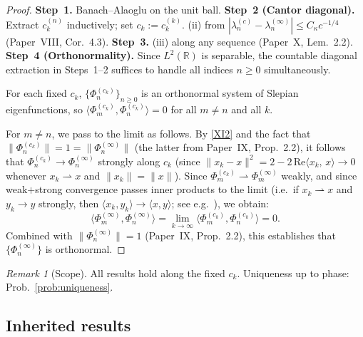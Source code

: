 \documentclass[12pt,a4paper]{amsart}
\theoremstyle{definition}
\theoremstyle{remark}
\newtheorem{remark}[theorem]{Remark}
\newcommand{\ip}[2]{\langle #1,\, #2\rangle}
\begin{document}
\begin{proof}
\textbf{Step~1.} Banach--Alaoglu on the unit ball.
\textbf{Step~2 (Cantor diagonal).}
Extract $c_k^{(n)}$ inductively;
set $c_k:=c_k^{(k)}$.
(ii) from $|\lambda_n^{(c)}-\lambda_n^{(\infty)}|
\le C_\kappa c^{-1/4}$ (Paper~VIII, Cor.~4.3).
\textbf{Step~3.} (iii) along any sequence
(Paper~X, Lem.~2.2).
\textbf{Step~4 (Orthonormality).}
Since $L^2(\mathbb{R})$ is separable,
the countable diagonal extraction in
Steps~1--2 suffices to handle all indices
$n \ge 0$ simultaneously.

For each fixed $c_k$, $\{\Phi_n^{(c_k)}\}_{n \ge 0}$
is an orthonormal system of Slepian eigenfunctions,
so $\langle \Phi_m^{(c_k)}, \Phi_n^{(c_k)} \rangle = 0$
for all $m \ne n$ and all $k$.

For $m \ne n$, we pass to the limit as follows.
By \eqref{XI2} and the fact that
$\|\Phi_n^{(c_k)}\| = 1 = \|\Phi_n^{(\infty)}\|$
(the latter from Paper~IX, Prop.~2.2),
it follows that $\Phi_n^{(c_k)} \to \Phi_n^{(\infty)}$
strongly along $c_k$
(since $\|x_k - x\|^2 = 2 - 2\,\mathrm{Re}\ip{x_k}{x} \to 0$
whenever $x_k \rightharpoonup x$ and $\|x_k\| = \|x\|$).
Since $\Phi_m^{(c_k)} \rightharpoonup \Phi_m^{(\infty)}$
weakly, and since weak$+$strong convergence passes
inner products to the limit
(i.e.\ if $x_k \rightharpoonup x$ and
$y_k \to y$ strongly, then
$\langle x_k, y_k \rangle \to \langle x, y \rangle$;
see e.g.\ \cite[Ch.~II]{ReedSimon1975}),
we obtain:
\[
  \langle \Phi_m^{(\infty)}, \Phi_n^{(\infty)} \rangle
  = \lim_{k \to \infty}
    \langle \Phi_m^{(c_k)}, \Phi_n^{(c_k)} \rangle
  = 0.
\]
Combined with $\|\Phi_n^{(\infty)}\| = 1$
(Paper~IX, Prop.~2.2), this establishes that
$\{\Phi_n^{(\infty)}\}$ is orthonormal.
\end{proof}

\begin{remark}[Scope]
All results hold along the fixed $c_k$.
Uniqueness up to phase: Prob.~\ref{prob:uniqueness}.
\end{remark}

\subsection{Inherited results}
\end{document}
